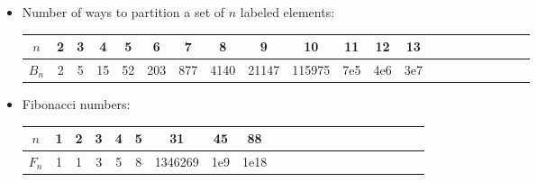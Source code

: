 {\begin{itemize}
  \item
  Number of ways to partition a set of $n$ labeled elements:\\
  \begin{tabular}{c|*{20}c}
    $n$             & 2 & 3  & 4  & 5   & 6   & 7    & 8     & 9 & 10     & 11  & 12  & 13  \\
                    \hline
    $B_n$           & 2 & 5 & 15 & 52 & 203 & 877 & 4140 & 21147 & 115975 & 7e5 & 4e6 & 3e7 \\
  \end{tabular}

\item Fibonacci numbers:
  \begin{tabular}{c|*{20}c}
    $n$             & 1 & 2 & 3  & 4  & 5   & 31      & 45   & 88   \\
                    \hline
    $F_n$           & 1 & 1 & 3  & 5  & 8   & 1346269 & 1e9  & 1e18 \\
  \end{tabular}
\end{itemize}
}

